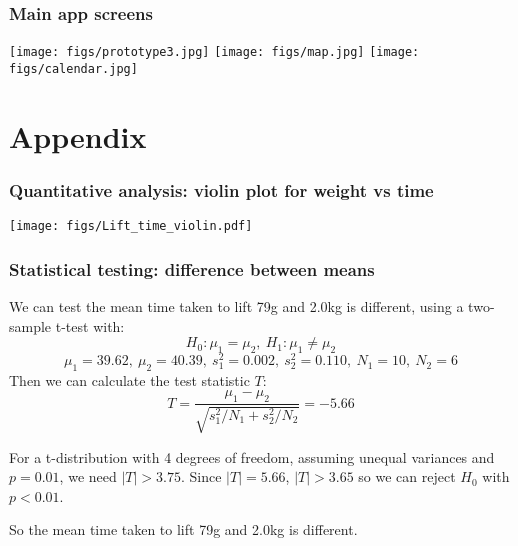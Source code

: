 \documentclass{beamer}
\begin{document}
\begin{frame}
  \frametitle{Main app screens}
  \begin{center}
    \texttt{[image: figs/prototype3.jpg]}
    \texttt{[image: figs/map.jpg]}
    \texttt{[image: figs/calendar.jpg]}
    \end{center}
\end{frame}

\section{Appendix}
\begin{frame}
  \frametitle{Quantitative analysis: violin plot for weight vs time}
  \begin{center}
    \texttt{[image: figs/Lift\_time\_violin.pdf]}
  \end{center}
\end{frame}

\begin{frame}
  \frametitle{Statistical testing: difference between means}
  We can test the mean time taken to lift 79g and 2.0kg is different, using a two-sample t-test with:
  $$H_0: \mu_1 = \mu_2,\ H_1: \mu_1 \neq \mu_2 $$
  $$ \mu_1 = 39.62,\ \mu_2 = 40.39,\ s^2_1 = 0.002,\ s^2_2 = 0.110,\ N_1 = 10,\ N_2 = 6$$
  Then we can calculate the test statistic $T$:
  $$T = \frac{\mu_1 - \mu_2}{\sqrt{s^2_1 / N_1 + s^2_2 / N_2}} = -5.66$$

  For a t-distribution with 4 degrees of freedom, assuming unequal variances and $p = 0.01$, we need $|T| > 3.75$. Since $|T| = 5.66$, $|T| > 3.65$ so we can reject $H_0$ with $p < 0.01$.

  So the mean time taken to lift 79g and 2.0kg is different. 
\end{frame}
\end{document}
